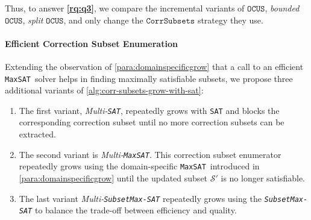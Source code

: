 \documentclass[twoside,11pt]{article}
\newcommand\m[1]{\mathcal{#1}}
\newcommand\mm[1]{\ensuremath{#1}\xspace}
\newcommand\call[1]{\mm{\texttt{#1}}}
\newcommand\sat{\texttt{{SAT}}\xspace}
\newcommand\subsetmaxsat{\texttt{SubsetMax-SAT}}
\newcommand\comus{\mm{\call{OCUS}}}
\newcommand\corrsubsets{\mm{\call{CorrSubsets}}}
\newcommand\maxsat{\texttt{MaxSAT}}
\begin{document}
Thus, to answer \textbf{\ref{rq:q3}}, we compare the incremental variants of \comus, \emph{bounded} \comus, \emph{split} \comus, and only change the \corrsubsets strategy they use.

\paragraph{Efficient Correction Subset Enumeration} 
Extending the observation of \cref{para:domainspecificgrow} that a call to an efficient \maxsat~solver helps in finding maximally satisfiable subsets, we propose three additional variants of \cref{alg:corr-subsets-grow-with-sat}:
\begin{enumerate}
	\item The first variant, \emph{Multi-\sat}, repeatedly grows with \sat and blocks the corresponding correction subset until no more correction subsets can be extracted.
	\item The second variant is \emph{Multi-\maxsat}. This correction subset enumerator repeatedly grows using the domain-specific \maxsat~introduced in \cref{para:domainspecificgrow} until the updated subset $\m{S}'$ is no longer satisfiable. 
	\item The last variant \emph{Multi-\subsetmaxsat} repeatedly grows using the \emph{\subsetmaxsat} to balance the trade-off between efficiency and quality.
\end{enumerate}
\end{document}
